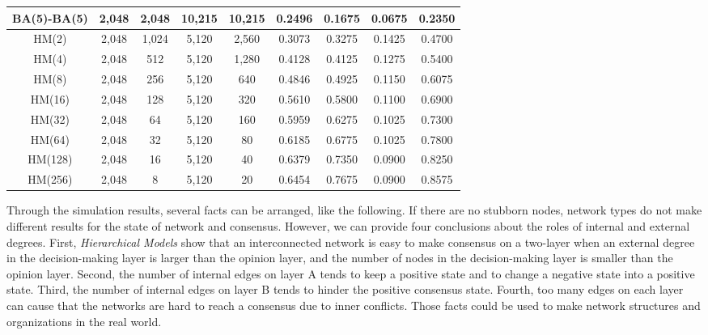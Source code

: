 \begin{table}[!htb]
\begin{center}
\begin{tabular}{c|c|c|c|c|c|c|c|c}
			BA(5)-BA(5)            & 2,048 	& 2,048   & 10,215  & 10,215  &  0.2496   & 0.1675 & 0.0675 & 0.2350   \\ \hline
			HM(2)  				   & 2,048 	& 1,024   & 5,120   & 2,560   &  0.3073   & 0.3275 & 0.1425 & 0.4700   \\ \hline    
			HM(4) 				   & 2,048 	&  512    & 5,120   & 1,280   &  0.4128   & 0.4125 & 0.1275 & 0.5400   \\ \hline
			HM(8)  				   & 2,048 	&  256    & 5,120   & 640     &  0.4846   & 0.4925 & 0.1150 & 0.6075   \\ \hline
			HM(16)				   & 2,048 	&  128    & 5,120   & 320     &  0.5610   & 0.5800 & 0.1100 & 0.6900   \\ \hline
			HM(32) 				   & 2,048 	&   64    & 5,120   & 160     &  0.5959   & 0.6275 & 0.1025 & 0.7300   \\ \hline
			HM(64) 				   & 2,048 	&   32    & 5,120   & 80      &  0.6185   & 0.6775 & 0.1025 & 0.7800   \\ \hline 
			HM(128) 			   & 2,048 	&   16    & 5,120   & 40      &  0.6379   & 0.7350 & 0.0900 & 0.8250   \\ \hline 
			HM(256) 			   & 2,048 	&    8    & 5,120   & 20      &  0.6454   & 0.7675 & 0.0900 & 0.8575   \\ \hline 
			 \hline
		\end{tabular}
	\end{center}
\end{table} 

Through the simulation results, several facts can be arranged, like the following. If there are no stubborn nodes, network types do not make different results for the state of network and consensus. However, we can provide four conclusions about the roles of internal and external degrees. First, \textit{Hierarchical Models} show that an interconnected network is easy to make consensus on a two-layer when an external degree in the decision-making layer is larger than the opinion layer, and the number of nodes in the decision-making layer is smaller than the opinion layer. Second, the number of internal edges on layer A tends to keep a positive state and to change a negative state into a positive state. Third, the number of internal edges on layer B tends to hinder the positive consensus state. Fourth, too many edges on each layer can cause that the networks are hard to reach a consensus due to inner conflicts. Those facts could be used to make network structures and organizations in the real world. \\
